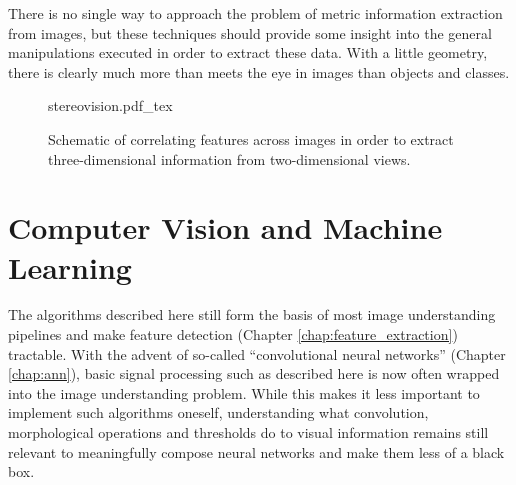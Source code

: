 There is no single way to approach the problem of metric information extraction from images, but these techniques should provide some insight into the general manipulations executed in order to extract these data. With a little geometry, there is clearly much more than meets the eye in images than objects and classes.


\begin{figure}
\centering
    \def\svgwidth{1.0\textwidth} 
    {stereovision.pdf_tex}
\caption{Schematic of correlating features across images in order to extract three-dimensional information from two-dimensional views.}
\label{fig:stereovision}
\end{figure}

\section{Computer Vision and Machine Learning}
\label{sec:cvml}
The algorithms described here still form the basis of most image understanding pipelines and make feature detection (Chapter \ref{chap:feature_extraction}) tractable. With the advent of so-called ``convolutional neural networks'' (Chapter \ref{chap:ann}), basic signal processing such as described here is now often wrapped into the image understanding problem. While this makes it less important to implement such algorithms oneself, understanding what convolution, morphological operations and thresholds do to visual information remains still relevant to meaningfully compose neural networks and make them less of a black box. 


